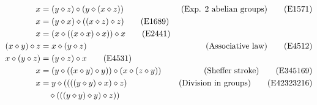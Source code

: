 \begin{align}
        x &= (y \diamond z) \diamond (y \diamond (x \diamond z)) & \hbox{(Exp. $2$ abelian groups)} \label{eq1571}\tag{E1571} \\
        x &= (y \diamond x) \diamond ((x \diamond z) \diamond z) \label{eq1689}\tag{E1689} \\
        x &= (x \diamond ((x \diamond x) \diamond x)) \diamond x \label{eq2441}\tag{E2441} \\
        (x \diamond y) \diamond z &= x \diamond (y \diamond z) &\hbox{(Associative law)} \label{eq4512}\tag{E4512}\\
        x \diamond (y \diamond z) &= (y \diamond z) \diamond x \label{eq4531}\tag{E4531} \\
        x &= (y \diamond ((x \diamond y) \diamond y)) \diamond (x \diamond (z \diamond y)) & \hbox{(Sheffer stroke)} \label{eq345169}\tag{E345169} \\
        x &= y \diamond ((((y \diamond y) \diamond x) \diamond z) & \hbox{(Division in groups)} \label{eq42323216}\tag{E42323216} \\
        & \quad  \diamond (((y \diamond y) \diamond y) \diamond z)) \nonumber
\end{align}
